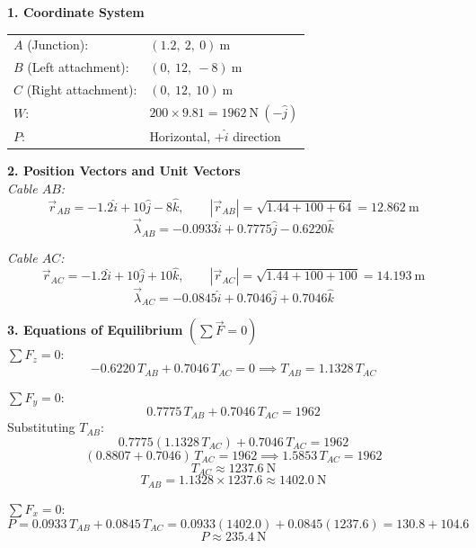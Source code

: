 \documentclass[12pt,a3paper]{article}
\begin{document}
\begin{enumerate}
\begin{tcolorbox}[enhanced,breakable,ansbox,colback=cD!4,colframe=cD,
  boxrule=0.8pt,arc=5pt,
  title={\textbf{Solution}},fonttitle=\bfseries\color{white},
  colbacktitle=cD]

\textbf{1. Coordinate System}\\[4pt]
\begin{center}
\begin{tabular}{ll}
  $A$ (Junction):          & $(1.2,\ 2,\ 0)\ \text{m}$ \\[3pt]
  $B$ (Left attachment):   & $(0,\ 12,\ -8)\ \text{m}$ \\[3pt]
  $C$ (Right attachment):  & $(0,\ 12,\ 10)\ \text{m}$ \\[3pt]
  $W$:                     & $200 \times 9.81 = 1962\ \text{N}\ (-\hat{j})$ \\[3pt]
  $P$:                     & Horizontal, $+\hat{i}$ direction
\end{tabular}
\end{center}

\medskip
\textbf{2. Position Vectors and Unit Vectors}\\[4pt]

\textit{Cable $AB$:}
\[
  \vec{r}_{AB} = -1.2\hat{i} + 10\hat{j} - 8\hat{k}, \qquad
  |\vec{r}_{AB}| = \sqrt{1.44 + 100 + 64} = 12.862\ \text{m}
\]
\[
  \vec{\lambda}_{AB} = -0.0933\hat{i} + 0.7775\hat{j} - 0.6220\hat{k}
\]

\textit{Cable $AC$:}
\[
  \vec{r}_{AC} = -1.2\hat{i} + 10\hat{j} + 10\hat{k}, \qquad
  |\vec{r}_{AC}| = \sqrt{1.44 + 100 + 100} = 14.193\ \text{m}
\]
\[
  \vec{\lambda}_{AC} = -0.0845\hat{i} + 0.7046\hat{j} + 0.7046\hat{k}
\]

\medskip
\textbf{3. Equations of Equilibrium} $\left(\sum \vec{F} = 0\right)$\\[4pt]

$\sum F_z = 0$:
\[
  -0.6220\,T_{AB} + 0.7046\,T_{AC} = 0
  \implies T_{AB} = 1.1328\,T_{AC}
\]

$\sum F_y = 0$:
\[
  0.7775\,T_{AB} + 0.7046\,T_{AC} = 1962
\]
Substituting $T_{AB}$:
\[
  0.7775(1.1328\,T_{AC}) + 0.7046\,T_{AC} = 1962
\]
\[
  (0.8807 + 0.7046)\,T_{AC} = 1962
  \implies 1.5853\,T_{AC} = 1962
\]
\[
  \boxed{T_{AC} \approx 1237.6\ \text{N}}
\]
\[
  \boxed{T_{AB} = 1.1328 \times 1237.6 \approx 1402.0\ \text{N}}
\]

$\sum F_x = 0$:
\[
  P = 0.0933\,T_{AB} + 0.0845\,T_{AC}
    = 0.0933(1402.0) + 0.0845(1237.6)
    = 130.8 + 104.6
\]
\[
  \boxed{P \approx 235.4\ \text{N}}
\]


\end{tcolorbox}
\end{enumerate}
\end{document}
